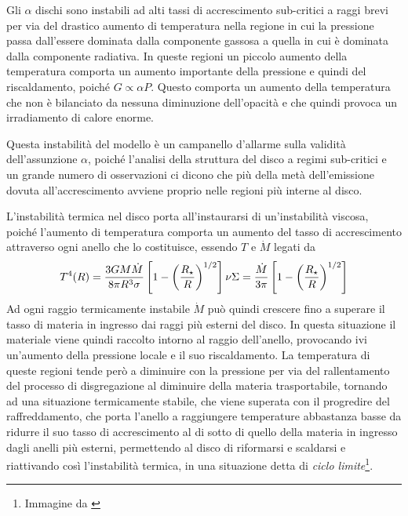 \documentclass[a4paperbi]{article}
\begin{document}
	Gli $\alpha$ dischi sono instabili ad alti tassi di accrescimento sub-critici a raggi brevi per via del drastico aumento di temperatura nella regione in cui la pressione passa dall'essere dominata dalla componente gassosa a quella in cui è dominata dalla componente radiativa. In queste regioni un piccolo aumento della temperatura comporta un aumento importante della pressione e quindi del riscaldamento, poiché $G\propto\alpha P$. Questo comporta un aumento della temperatura che non è bilanciato da nessuna diminuzione dell'opacità e che quindi provoca un irradiamento di calore enorme.
	 
	Questa instabilità del modello è un campanello d'allarme sulla validità dell'assunzione $\alpha$, poiché l'analisi della struttura del disco a regimi sub-critici e un grande numero di osservazioni ci dicono che più della metà dell'emissione dovuta all'accrescimento avviene proprio nelle regioni più interne al disco.
	
	L'instabilità termica nel disco porta all'instaurarsi di un'instabilità viscosa, poiché l'aumento di temperatura comporta un aumento del tasso di accrescimento attraverso ogni anello che lo costituisce, essendo $T$ e $\dot{M}$ legati da
	\begin{equation*}
		T^4(R)=\frac{3GM\dot{M}}{8\pi R^3\sigma}\left[1-\left(\frac{R_{\star}}{R}\right)^{1/2}\right]\\
		\nu\Sigma=\frac{\dot{M}}{3\pi}\left[1-\left(\frac{R_{\star}}{R}\right)^{1/2}\right]
	\end{equation*}
	Ad ogni raggio termicamente instabile $\dot{M}$ può quindi crescere fino a superare il tasso di materia in ingresso dai raggi più esterni del disco. In questa situazione il materiale viene quindi raccolto intorno al raggio dell'anello, provocando ivi un'aumento della pressione locale e il suo riscaldamento. La temperatura di queste regioni tende però a diminuire con la pressione per via del rallentamento del processo di disgregazione al diminuire della materia trasportabile, tornando ad una situazione termicamente stabile, che viene superata con il progredire del raffreddamento, che porta l'anello a raggiungere temperature abbastanza basse da ridurre il suo tasso di accrescimento al di sotto di quello della materia in ingresso dagli anelli più esterni, permettendo al disco di riformarsi e scaldarsi e riattivando così l'instabilità termica, in una situazione detta di \textit{ciclo limite}\footnote{Immagine da \cite{FrankKingRaineAccretionPower}}.
\end{document}
